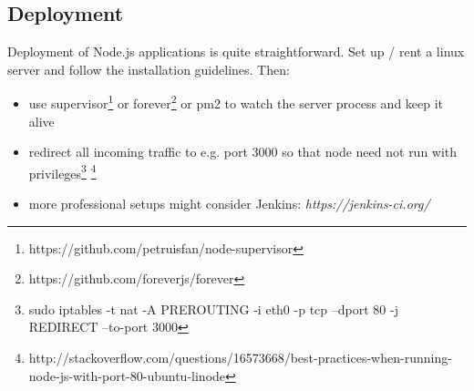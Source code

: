 \subsection{Deployment}
Deployment of Node.js applications is quite straightforward. Set up / rent a linux server and follow the installation guidelines. Then:
\begin{itemize}
    \item use supervisor\footnote{https://github.com/petruisfan/node-supervisor} or forever\footnote{https://github.com/foreverjs/forever} or pm2 to watch the server process and keep it alive
    \item redirect all incoming traffic to e.g. port 3000 so that node need not run with privileges\footnote{sudo iptables -t nat -A PREROUTING -i eth0 -p tcp --dport 80 -j REDIRECT --to-port 3000} \footnote{http://stackoverflow.com/questions/16573668/best-practices-when-running-node-js-with-port-80-ubuntu-linode}
    \item more professional setups might consider Jenkins: \textit{https://jenkins-ci.org/}
\end{itemize}
